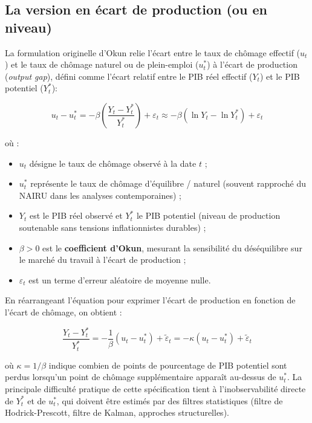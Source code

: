 \documentclass[11pt,a4paper]{article}
\begin{document}
\subsection{La version en écart de production (ou en niveau)}

La formulation originelle d'Okun relie l'écart entre le taux de chômage effectif ($u_t$) et le taux de chômage naturel ou de plein-emploi ($u_t^*$) à l'écart de production (\textit{output gap}), défini comme l'écart relatif entre le PIB réel effectif ($Y_t$) et le PIB potentiel ($Y_t^*$):

\begin{equation}
u_t - u_t^* = -\beta \left( \frac{Y_t - Y_t^*}{Y_t^*} \right) + \varepsilon_t \approx -\beta \left( \ln Y_t - \ln Y_t^* \right) + \varepsilon_t
\end{equation}

où :
\begin{itemize}[leftmargin=1.5em]
    \item $u_t$ désigne le taux de chômage observé à la date $t$ ;
    \item $u_t^*$ représente le taux de chômage d'équilibre / naturel (souvent rapproché du NAIRU dans les analyses contemporaines) ;
    \item $Y_t$ est le PIB réel observé et $Y_t^*$ le PIB potentiel (niveau de production soutenable sans tensions inflationnistes durables) ;
    \item $\beta > 0$ est le \textbf{coefficient d'Okun}, mesurant la sensibilité du déséquilibre sur le marché du travail à l'écart de production ;
    \item $\varepsilon_t$ est un terme d'erreur aléatoire de moyenne nulle.
\end{itemize}

En réarrangeant l'équation pour exprimer l'écart de production en fonction de l'écart de chômage, on obtient :

\begin{equation}
\frac{Y_t - Y_t^*}{Y_t^*} = -\frac{1}{\beta}(u_t - u_t^*) + \tilde{\varepsilon}_t = -\kappa (u_t - u_t^*) + \tilde{\varepsilon}_t
\end{equation}

où $\kappa = 1/\beta$ indique combien de points de pourcentage de PIB potentiel sont perdus lorsqu'un point de chômage supplémentaire apparaît au-dessus de $u_t^*$. La principale difficulté pratique de cette spécification tient à l'inobservabilité directe de $Y_t^*$ et de $u_t^*$, qui doivent être estimés par des filtres statistiques (filtre de Hodrick-Prescott, filtre de Kalman, approches structurelles).
\end{document}
